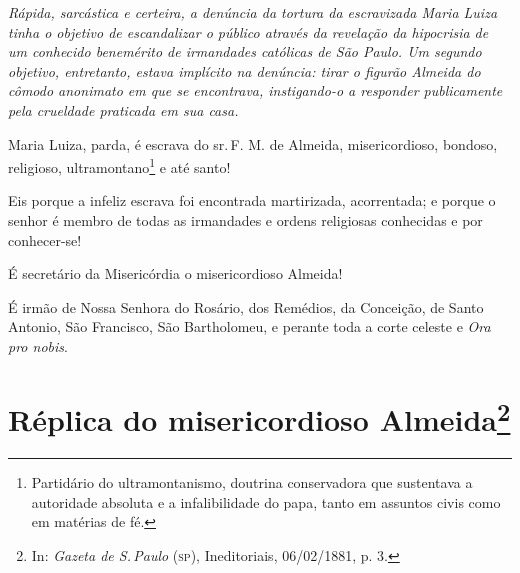 
\begin{resumo}
\emph{Rápida, sarcástica e certeira, a denúncia da tortura da
escravizada Maria Luiza tinha o objetivo de escandalizar o público
através da revelação da hipocrisia de um conhecido benemérito de
irmandades católicas de São Paulo. Um segundo objetivo,
entretanto, estava implícito na denúncia: tirar o figurão Almeida do
cômodo anonimato em que se encontrava, instigando-o a responder
publicamente pela crueldade praticada em sua casa.}
\end{resumo}

Maria Luiza, parda, é escrava do sr.\,F. M. de Almeida, misericordioso,
bondoso, religioso, ultramontano\footnote{Partidário do
  ultramontanismo, doutrina conservadora que sustentava a autoridade
  absoluta e a infalibilidade do papa, tanto em assuntos civis como em
  matérias de fé.} e até
santo!

Eis porque a infeliz escrava foi encontrada martirizada, acorrentada; e
porque o senhor é membro de todas as irmandades e ordens religiosas
conhecidas e por conhecer-se!

É secretário da Misericórdia o misericordioso Almeida!

É irmão de Nossa Senhora do Rosário, dos Remédios, da Conceição, de
Santo Antonio, São Francisco, São Bartholomeu, e perante toda a corte
celeste e \emph{Ora pro nobis}.

\pagebreak
\section{Réplica do misericordioso Almeida\protect\footnote{\MakeUppercase{I}n:
  \emph{\MakeUppercase{G}azeta de \MakeUppercase{S}.\,\MakeUppercase{P}aulo} (\textsc{sp}), \MakeUppercase{I}neditoriais, 06/02/1881, p. 3.}}

